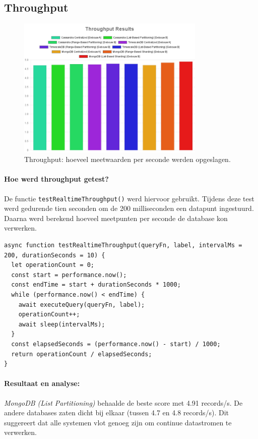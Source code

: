 \subsection{Throughput}

\begin{figure}[H]
	\centering
	\includegraphics[width=0.8\textwidth]{charts/Throughput.png}
	\caption{Throughput: hoeveel meetwaarden per seconde werden opgeslagen.}
	\label{fig:throughput-comparison}
\end{figure}

\paragraph{Hoe werd throughput getest?}
De functie \texttt{testRealtimeThroughput()} werd hiervoor gebruikt. Tijdens deze test werd gedurende tien seconden om de 200 milliseconden een datapunt ingestuurd. Daarna werd berekend hoeveel meetpunten per seconde de database kon verwerken.

\begin{verbatim}
async function testRealtimeThroughput(queryFn, label, intervalMs = 200, durationSeconds = 10) {
  let operationCount = 0;
  const start = performance.now();
  const endTime = start + durationSeconds * 1000;
  while (performance.now() < endTime) {
    await executeQuery(queryFn, label);
    operationCount++;
    await sleep(intervalMs);
  }
  const elapsedSeconds = (performance.now() - start) / 1000;
  return operationCount / elapsedSeconds;
}
\end{verbatim}

\paragraph{Resultaat en analyse:}
\textit{MongoDB (List Partitioning)} behaalde de beste score met 4.91 records/s. De andere databases zaten dicht bij elkaar (tussen 4.7 en 4.8 records/s). Dit suggereert dat alle systemen vlot genoeg zijn om continue datastromen te verwerken.

